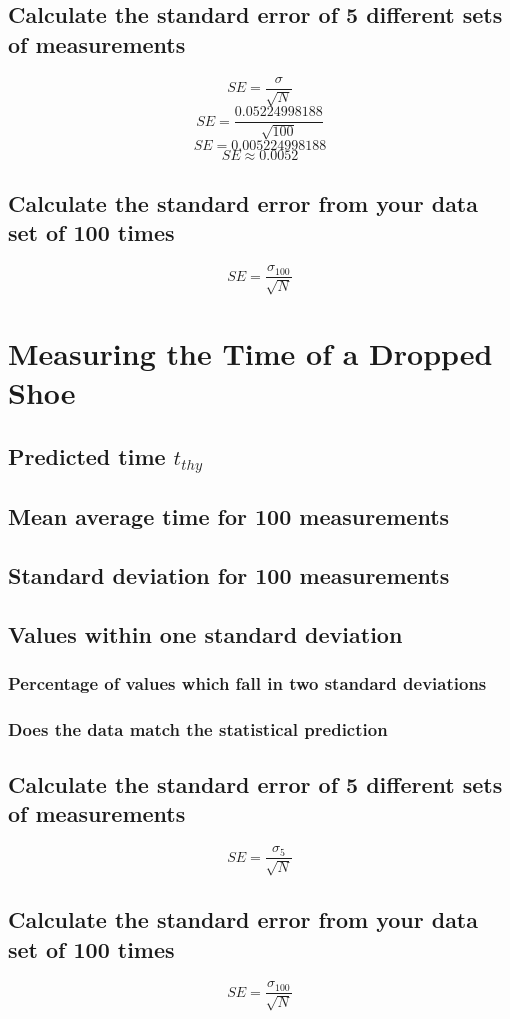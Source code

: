 \documentclass[11pt, letterpaper, includehead]{article}
\begin{document}
  \subsection{Calculate the standard error of 5 different sets of measurements}

  $$SE = \frac{\sigma}{\sqrt{N}}$$
  $$SE = \frac{0.05224998188}{\sqrt{100}}$$
  $$SE = 0.005224998188$$
  $$SE \approx 0.0052$$

  \subsection{Calculate the standard error from your data set of 100 times}

  $$SE = \frac{\sigma_{100}}{\sqrt{N}}$$

  \section{Measuring the Time of a Dropped Shoe}

  \subsection{Predicted time $t_{thy}$} %

  \setcounter{subsection}{3} %
  \subsection{Mean average time for 100 measurements} %

  \subsection{Standard deviation for 100 measurements} %

  \subsection{Values within one standard deviation} %

  \subsubsection{Percentage of values which fall in two standard deviations}

  \subsubsection{Does the data match the statistical prediction}

  \subsection{Calculate the standard error of 5 different sets of measurements}

  $$SE = \frac{\sigma_{5}}{\sqrt{N}}$$

  \subsection{Calculate the standard error from your data set of 100 times}

  $$SE = \frac{\sigma_{100}}{\sqrt{N}}$$

  
\end{document}
